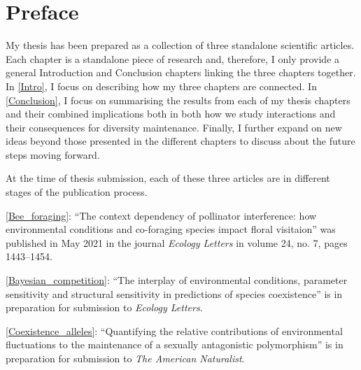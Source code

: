 

\chapter*{Preface} %
My thesis has been prepared as a collection of three standalone scientific articles. Each chapter is a standalone piece of research and, therefore, I only provide a general Introduction and Conclusion chapters linking the three chapters together. In  \autoref{Intro}, I focus on describing how my three chapters are connected. In \autoref{Conclusion}, I focus on summarising the results from each of my thesis chapters and their combined implications both in both how we study interactions and their consequences for diversity maintenance. Finally, I further expand on new ideas beyond those presented in the different chapters to discuss about the future steps moving forward.


At the time of thesis submission, each of these three articles are in different stages of the publication process.

\autoref{Bee_foraging}: ``The context dependency of pollinator interference: how environmental conditions and co-foraging species impact floral visitaion'' was published in May 2021 in the journal \textit{Ecology Letters} in volume 24, no. 7, pages 1443--1454.

\autoref{Bayesian_competition}: ``The interplay of environmental conditions, parameter sensitivity and structural sensitivity in predictions of species coexistence'' is in preparation for submission to \textit{Ecology Letters}.

\autoref{Coexistence_alleles}: ``Quantifying the relative contributions of environmental fluctuations to the maintenance of a sexually antagonistic polymorphism'' is in preparation for submission to \textit{The American Naturalist}.



